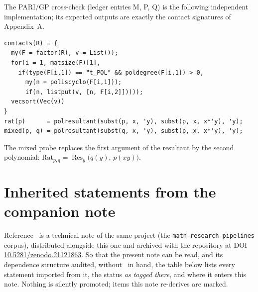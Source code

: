 \documentclass[11pt]{article}
\theoremstyle{plain}
\theoremstyle{definition}
\theoremstyle{remark}
\newcommand{\Rat}{\mathrm{Rat}}
\DeclareMathOperator{\Res}{Res}
\begin{document}
\noindent The PARI/GP cross-check (ledger entries M, P, Q) is the following
independent implementation; its expected outputs are exactly the contact
signatures of Appendix~A.

\begin{verbatim}
contacts(R) = {
  my(F = factor(R), v = List());
  for(i = 1, matsize(F)[1],
    if(type(F[i,1]) == "t_POL" && poldegree(F[i,1]) > 0,
      my(n = poliscyclo(F[i,1]));
      if(n, listput(v, [n, F[i,2]]))));
  vecsort(Vec(v))
}
rat(p)      = polresultant(subst(p, x, 'y), subst(p, x, x*'y), 'y);
mixed(p, q) = polresultant(subst(q, x, 'y), subst(p, x, x*'y), 'y);
\end{verbatim}

\noindent The mixed probe replaces the first argument of the resultant by the
second polynomial: $\Rat_{p,q}=\Res_y\bigl(q(y),\,p(xy)\bigr)$.

\section{Inherited statements from the companion note}\label{app:inherited}

Reference~\cite{CMC} is a technical note of the same project
(the \texttt{math-research-pipelines} corpus), distributed alongside this
one and archived with the repository at DOI
\url{10.5281/zenodo.21121863}. So that the present note can be
read, and its dependence structure audited, without~\cite{CMC} in hand, the
table below lists every
statement imported from it, the status \emph{as tagged there}, and where it
enters this note. Nothing is silently promoted; items this note re-derives
are marked.
\end{document}
